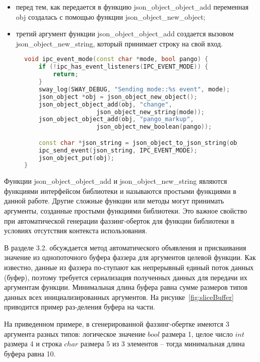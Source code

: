 \begin{itemize}
    \item перед тем, как передается в функцию json\_object\_object\_add переменная obj создалась с помощью функции json\_object\_new\_object\(\);
    \item третий аргумент функции json\_object\_object\_add\(\) создается вызовом json\_object\_new\_string, который принимает строку на свой вход.
\end{itemize}

\begin{figure}[thp]
\begin{lstlisting}[language=C++,frame=single,caption={Пример использования библиотеки},label=lst:exampleJsonC]
void ipc_event_mode(const char *mode, bool pango) {
    if (!ipc_has_event_listeners(IPC_EVENT_MODE)) {
        return;
    }
    sway_log(SWAY_DEBUG, "Sending mode::%s event", mode);
    json_object *obj = json_object_new_object();
    json_object_object_add(obj, "change", 
                    json_object_new_string(mode));
    json_object_object_add(obj, "pango_markup",
                    json_object_new_boolean(pango));

    const char *json_string = json_object_to_json_string(obj);
    ipc_send_event(json_string, IPC_EVENT_MODE);
    json_object_put(obj);
}
\end{lstlisting}
\end{figure}
Функции json\_object\_object\_add и json\_object\_new\_string являются функциями интерфейсом библиотеки и называются простыми функциями в данной работе. Другие сложные функции или методы могут принимать аргументы, созданные простыми функциями библиотеки. Это важное свойство при автоматической генерации фаззинг-оберток для функции библиотеки в условиях отсутствия контекста использования.

В разделе 3.2. обсуждается метод автоматического объявления и присваивания значение из однопоточного буфера фаззера для аргументов целевой функции.
Как известно, данные из фаззера по-ступают как непрерывный единый поток данных (буфер), поэтому требуется сериализация полученных данных для передачи их аргументам функции. Минимальная длина буфера равна сумме размеров типов данных всех инициализированных аргументов. На рисунке~\cref{fig:sliceBuffer} приводится пример раз-деления буфера на части.

На приведенном примере, в сгенерированной фаззинг-обертке имеются 3 аргумента разных типов: логическое значение \(bool\) размера 1, целое число \(int\) размера 4 и строка \(char\) размера 5  из 3 элементов – тогда минимальная длина буфера равна 10.

